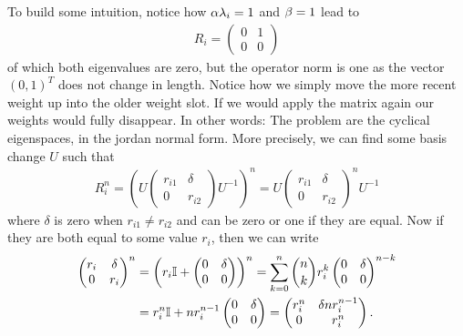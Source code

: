 To build some intuition, notice how \(\alpha\lambda_i=1\) and \(\beta=1\)
lead to
\begin{align*}
	R_i
	=\begin{pmatrix}
		0 & 1 \\
		0 & 0
	\end{pmatrix}
\end{align*}
of which both eigenvalues are zero, but the operator norm is one as the vector
\((0, 1)^T\) does not change in length. Notice how we simply move the more
recent weight up into the older weight slot. If we would apply the matrix again
our weights would fully disappear. In other words: The problem are the cyclical
eigenspaces, in the jordan normal form. More precisely, we can find some
basis change \(U\) such that
\begin{align*}
	R_i^n
	= \left(U 
		\begin{pmatrix}
			r_{i1} & \delta\\
			0 & r_{i2}
		\end{pmatrix}
	U^{-1}\right)^n
	= U 
	\begin{pmatrix}
		r_{i1} & \delta\\
		0 & r_{i2}
	\end{pmatrix}^n
	 U^{-1}
\end{align*}
where \(\delta\) is zero when \(r_{i1}\neq r_{i2}\) and can be zero or one if
they are equal. Now if they are both equal to some value \(r_i\), then we
can write
\begin{align*}
	\begin{pmatrix}
		r_i & \delta\\
		0 & r_i
	\end{pmatrix}^n
	&= \left(r_i\mathbb{I} + 
	\begin{pmatrix}
		0 & \delta\\
		0 & 0 
	\end{pmatrix}\right)^n
	= \sum_{k=0}^n {n\choose k} r_i^k \begin{pmatrix}
		0 & \delta \\
		0 & 0
	\end{pmatrix}^{n-k}\\
	&= r_i^n\mathbb{I} + n r_i^{n-1}\begin{pmatrix}
		0 & \delta \\
		0 & 0
	\end{pmatrix}
	= \begin{pmatrix}
		r_i^n & \delta n r_i^{n-1} \\
		0 & r_i^n
	\end{pmatrix}.
\end{align*}
